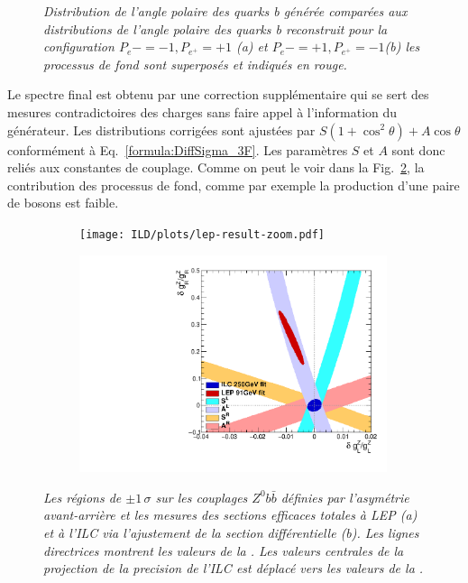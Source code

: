 \begin{figure}
\begin{subfigure}{0.5\textwidth}
		\caption{\label{fig:BAsymmetryFinal_b_3F} }
	\end{subfigure}
	\caption{\sl Distribution de l'angle polaire des quarks b générée comparées aux distributions de l'angle polaire des quarks b reconstruit pour la configuration $P_{e}-=-1, P_{e^+}=+1$ (a) et $P_{e}-=+1, P_{e^+}=-1$(b) les processus de fond sont superposés  et indiqués en rouge.}
	\label{fig:BAsymmetryFinal_3F}
\end{figure}

Le spectre final est obtenu par une correction supplémentaire qui se sert des mesures contradictoires des charges sans faire appel à l'information du générateur.  %
Les distributions corrigées sont ajustées par $S(1+\cos^2\theta) + A\cos\theta$ conformément à  Eq.~\ref{formula:DiffSigma_3F}. Les paramètres $S$ et $A$ sont donc reliés aux constantes de couplage. 
Comme on peut le voir dans la Fig.~\ref{fig:BAsymmetryFinal_3F}, la contribution des processus de fond, comme par exemple la production d'une paire de bosons est faible.

\begin{figure}
	\centering
	\begin{subfigure}{0.5\textwidth}
		\texttt{[image: ILD/plots/lep-result-zoom.pdf]}
		\caption{\label{fig:LEPILCResult_a_3F} }
	\end{subfigure}%
	\begin{subfigure}{0.5\textwidth}
		\centering
		\includegraphics[width=0.99\textwidth]{ILD/plots/ilc-result.pdf}
		\caption{\label{fig:LEPILCResult_b_3F} }
	\end{subfigure}
	\caption{\sl Les régions de $\pm 1\,\sigma$ sur les couplages $Z^0b\bar{b}$ définies par l'asymétrie avant-arrière et les mesures des sections efficaces totales à LEP (a) et à l'ILC via l'ajustement de la section différentielle (b). Les lignes directrices montrent les valeurs de la \sm.
		Les valeurs centrales de la projection de la precision de  l'ILC est déplacé vers les valeurs de la \sm.
	}
	\label{fig:LEPILCResult_3F}
\end{figure}

